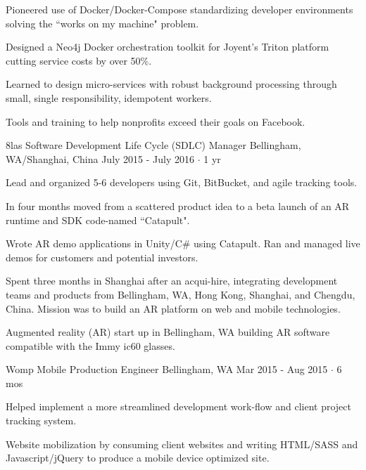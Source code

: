 \documentclass[11pt, a4paper]{awesome-cv}
\begin{document}
\begin{cventries}
{\begin{cvitems}
        \item Pioneered use of Docker/Docker-Compose standardizing developer environments solving the ``works on my machine" problem.
        \item Designed a Neo4j Docker orchestration toolkit for Joyent's Triton platform cutting service costs by over 50\%.
        \item Learned to design micro-services with robust background processing through small, single responsibility, idempotent workers.
      \end{cvitems}
    }
    {
      Tools and training to help nonprofits exceed their goals on Facebook.
    }

  \cventry
    {8las} %
    {Software Development Life Cycle (SDLC) Manager} %
    {Bellingham, WA/Shanghai, China} %
    {July 2015 - July 2016 $\cdot$ 1 yr} %
    {
      \begin{cvitems} %
        \item Lead and organized 5-6 developers using Git, BitBucket, and agile tracking tools.
        \item In four months moved from a scattered product idea to a beta launch of an AR runtime and SDK code-named ``Catapult".
        \item Wrote AR demo applications in Unity/C\# using Catapult. Ran and managed live demos for customers and potential investors.
        \item Spent three months in Shanghai after an acqui-hire, integrating development teams and products from Bellingham, WA, Hong Kong, Shanghai, and Chengdu, China. Mission was to build an AR platform on web and mobile technologies.
      \end{cvitems}
    }
    {
      Augmented reality (AR) start up in Bellingham, WA building AR software compatible with the Immy ic60 glasses.
    }

  \cventry
    {Womp Mobile} %
    {Production Engineer} %
    {Bellingham, WA} %
    {Mar 2015 - Aug 2015  $\cdot$ 6 mos} %
    {
      \begin{cvitems} %
        \item Helped implement a more streamlined development work-flow and client project tracking system.
      \end{cvitems}
    }
    {
      Website mobilization by consuming client websites and writing HTML/SASS and Javascript/jQuery to produce a mobile device optimized site.
    }


\end{cventries}
\end{document}
